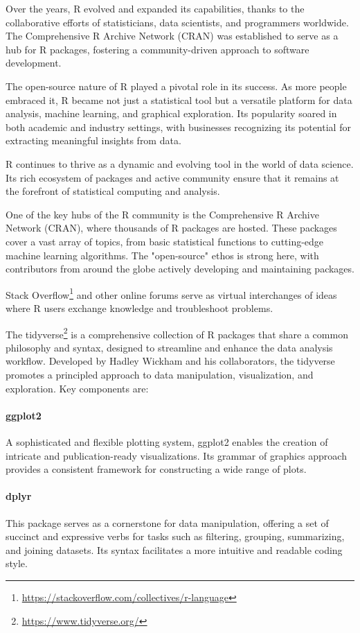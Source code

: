 Over the years, R evolved and expanded its capabilities, thanks to the collaborative efforts of statisticians, data scientists, and programmers worldwide. The Comprehensive R Archive Network (CRAN) was established to serve as a hub for R packages, fostering a community-driven approach to software development.

The open-source nature of R played a pivotal role in its success. As more people embraced it, R became not just a statistical tool but a versatile platform for data analysis, machine learning, and graphical exploration. Its popularity soared in both academic and industry settings, with businesses recognizing its potential for extracting meaningful insights from data.

R continues to thrive as a dynamic and evolving tool in the world of data science. Its rich ecosystem of packages and active community ensure that it remains at the forefront of statistical computing and analysis. 

One of the key hubs of the R community is the Comprehensive R Archive Network (CRAN), where thousands of R packages are hosted. These packages cover a vast array of topics, from basic statistical functions to cutting-edge machine learning algorithms. The "open-source" ethos is strong here, with contributors from around the globe actively developing and maintaining packages.

Stack Overflow\footnote{\url{https://stackoverflow.com/collectives/r-language}} and other online forums serve as virtual interchanges of ideas where R users exchange knowledge and troubleshoot problems.

The tidyverse\footnote{\url{https://www.tidyverse.org/}} is a comprehensive collection of R packages that share a common philosophy and syntax, designed to streamline and enhance the data analysis workflow. Developed by Hadley Wickham and his collaborators, the tidyverse promotes a principled approach to data manipulation, visualization, and exploration. Key components are:

\paragraph*{ggplot2} A sophisticated and flexible plotting system, ggplot2 enables the creation of intricate and publication-ready visualizations. Its grammar of graphics approach provides a consistent framework for constructing a wide range of plots.

\paragraph*{dplyr} This package serves as a cornerstone for data manipulation, offering a set of succinct and expressive verbs for tasks such as filtering, grouping, summarizing, and joining datasets. Its syntax facilitates a more intuitive and readable coding style.

